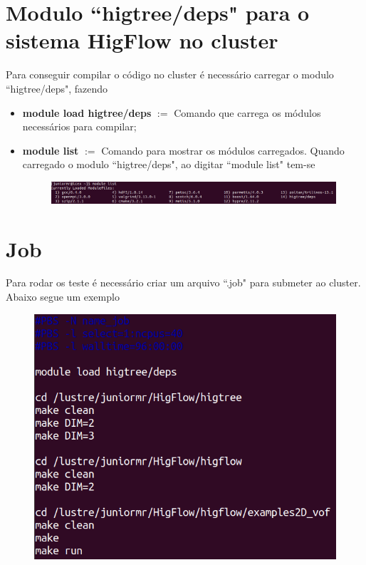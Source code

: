 \documentclass[12pt]{article}
\begin{document}
\section{Modulo ``higtree/deps" para o sistema HigFlow no cluster}

Para conseguir compilar o código no cluster é necessário carregar o modulo ``higtree/deps", fazendo
\begin{itemize}
	\item \textbf{module load higtree/deps} $:=$ Comando que carrega os módulos necessários para compilar;
	\item \textbf{module list} $:=$ Comando para mostrar os módulos carregados. Quando carregado o modulo ``higtree/deps", ao digitar ``module list" tem-se
	\begin{figure}[htb]
		\centering
		\includegraphics[width=1.0\linewidth]{figures/module_list}
		\label{fig:fig02}
	\end{figure}
\end{itemize}

\section{Job}\label{sec:job_fun}

Para rodar os teste é necessário criar um arquivo ``.job" para submeter ao cluster. Abaixo segue um exemplo
\begin{figure}[htb]
	\centering
	\includegraphics[width=0.80\linewidth]{figures/submission_job}
	\label{fig:fig03}
\end{figure}


%
%
\end{document}

